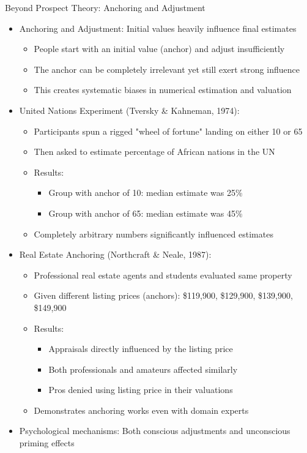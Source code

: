 \documentclass[10pt]{beamer}
\begin{document}
\begin{frame}{Beyond Prospect Theory: Anchoring and Adjustment}
  \begin{itemize}[<+->]
    \item Anchoring and Adjustment: Initial values heavily influence final estimates
      \begin{itemize}
        \item People start with an initial value (anchor) and adjust insufficiently
        \item The anchor can be completely irrelevant yet still exert strong influence
        \item This creates systematic biases in numerical estimation and valuation
      \end{itemize}
    \item United Nations Experiment (Tversky \& Kahneman, 1974):
      \begin{itemize}
        \item Participants spun a rigged "wheel of fortune" landing on either 10 or 65
        \item Then asked to estimate percentage of African nations in the UN
        \item Results:
          \begin{itemize}
            \item Group with anchor of 10: median estimate was 25\%
            \item Group with anchor of 65: median estimate was 45\%
          \end{itemize}
        \item Completely arbitrary numbers significantly influenced estimates
      \end{itemize}
    \item Real Estate Anchoring (Northcraft \& Neale, 1987):
      \begin{itemize}
        \item Professional real estate agents and students evaluated same property
        \item Given different listing prices (anchors): \$119,900, \$129,900, \$139,900, \$149,900
        \item Results:
          \begin{itemize}
            \item Appraisals directly influenced by the listing price
            \item Both professionals and amateurs affected similarly
            \item Pros denied using listing price in their valuations
          \end{itemize}
        \item Demonstrates anchoring works even with domain experts
      \end{itemize}
    \item Psychological mechanisms: Both conscious adjustments and unconscious priming effects
  \end{itemize}
\end{frame}
\end{document}
